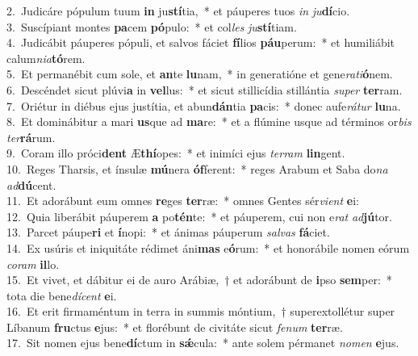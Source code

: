 {2.~}Judicáre pópulum tuum \textbf{in} ju\textbf{stí}tia,~* et páuperes tuos \textit{in} \textit{ju}\textbf{dí}cio.\\
{3.~}Suscípiant montes \textbf{pa}cem \textbf{pó}pulo:~* et col\textit{les} \textit{ju}\textbf{stí}tiam.\\
{4.~}Judicábit páuperes pópuli, et salvos fáciet \textbf{fí}lios \textbf{páu}perum:~* et humiliábit calum\textit{ni}\textit{a}\textbf{tó}rem.\\
{5.~}Et permanébit cum sole, et \textbf{an}te \textbf{lu}nam,~* in generatióne et gene\textit{ra}\textit{ti}\textbf{ó}nem.\\
{6.~}Descéndet sicut plúvi\textbf{a} in \textbf{vel}lus:~* et sicut stillicídia stillántia \textit{su}\textit{per} \textbf{ter}ram.\\
{7.~}Oriétur in diébus ejus justítia, et abun\textbf{dán}tia \textbf{pa}cis:~* donec aufe\textit{rá}\textit{tur} \textbf{lu}na.\\
{8.~}Et dominábitur a mari \textbf{us}que ad \textbf{ma}re:~* et a flúmine usque ad términos or\textit{bis} \textit{ter}\textbf{rá}rum.\\
{9.~}Coram illo próci\textbf{dent} Æ\textbf{thí}opes:~* et inimíci ejus \textit{ter}\textit{ram} \textbf{lin}gent.\\
{10.~}Reges Tharsis, et ínsulæ \textbf{mú}nera \textbf{óf}ferent:~* reges Arabum et Saba do\textit{na} \textit{ad}\textbf{dú}cent.\\
{11.~}Et adorábunt eum omnes \textbf{re}ges \textbf{ter}ræ:~* omnes Gentes sér\textit{vi}\textit{ent} \textbf{e}i:\\
{12.~}Quia liberábit páuperem \textbf{a} po\textbf{tén}te:~* et páuperem, cui non e\textit{rat} \textit{ad}\textbf{jú}tor.\\
{13.~}Parcet páupe\textbf{ri} et \textbf{í}nopi:~* et ánimas páuperum \textit{sal}\textit{vas} \textbf{fá}ciet.\\
{14.~}Ex usúris et iniquitáte rédimet áni\textbf{mas} e\textbf{ó}rum:~* et honorábile nomen eórum \textit{co}\textit{ram} \textbf{il}lo.\\
{15.~}Et vivet, et dábitur ei de auro Arábiæ,~† et adorábunt de \textbf{i}pso \textbf{sem}per:~* tota die bene\textit{dí}\textit{cent} \textbf{e}i.\\
{16.~}Et erit firmaméntum in terra in summis móntium,~† superextollétur super Líbanum \textbf{fru}ctus \textbf{e}jus:~* et florébunt de civitáte sicut \textit{fe}\textit{num} \textbf{ter}ræ.\\
{17.~}Sit nomen ejus bene\textbf{dí}ctum in \textbf{sǽ}cula:~* ante solem pérmanet \textit{no}\textit{men} \textbf{e}jus.\\
